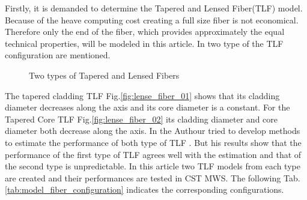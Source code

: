 

Firstly, it is demanded to determine the Tapered and Lensed Fiber(TLF) model. Because of the heave computing cost creating a full size fiber is not economical. Therefore only the end of the fiber, which provides approximately the equal technical properties, will be modeled in this article. In \cite{TLF_analysis} \cite{TLF_mode_transforming} two type of the TLF configuration are mentioned. 


\begin{figure}[!ht]
\centering
{}
\hfill
{}
\label{fig:two_TLF}
\caption{Two types of Tapered and Lensed Fibers}
\end{figure}

The tapered cladding TLF Fig.\quad\ref{fig:lense_fiber_01} shows that its cladding diameter decreases along the axis and its core diameter is a constant. For the Tapered Core TLF Fig.\quad\ref{fig:lense_fiber_02} its cladding diameter and core diameter both decrease along the axis. In \cite{TLF_mode_transforming} the Authour tried to develop methods to estimate the performance of both type of TLF .  But his results show that the performance of the first type of TLF agrees well with the estimation and that of the second type is unpredictable. 
In this article two TLF models from each type are created and their performances are tested in CST MWS. The following Tab.\quad\ref{tab:model_fiber_configuration} indicates the corresponding configurations.



